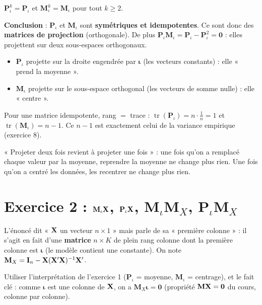 \documentclass[11pt,a4paper]{article}
\newcommand{\vi}{\bm{\iota}}
\newcommand{\I}{\mathbf{I}}\newcommand{\J}{\mathbf{J}}
\newcommand{\Pm}{\mathbf{P}}\newcommand{\Mm}{\mathbf{M}}
\newcommand{\tr}{\operatorname{tr}}\newcommand{\EQM}{\operatorname{EQM}}
\begin{document}
\begin{reponse}
$\Pm_\iota^k=\Pm_\iota$ et $\Mm_\iota^k=\Mm_\iota$ pour tout $k\ge2$.

\textbf{Conclusion} : $\Pm_\iota$ et $\Mm_\iota$ sont \textbf{symétriques et idempotentes}. Ce sont donc des \textbf{matrices de projection} (orthogonale). De plus $\Pm_\iota\Mm_\iota=\Pm_\iota-\Pm_\iota^2=\mathbf 0$ : elles projettent sur deux sous-espaces orthogonaux.
\begin{itemize}[nosep]
\item $\Pm_\iota$ projette sur la droite engendrée par $\vi$ (les vecteurs constants) : elle « prend la moyenne ».
\item $\Mm_\iota$ projette sur le sous-espace orthogonal (les vecteurs de somme nulle) : elle « centre ».
\end{itemize}
Pour une matrice idempotente, rang $=$ trace : $\tr(\Pm_\iota)=n\cdot\frac1n=1$ et $\tr(\Mm_\iota)=n-1$. Ce $n-1$ est exactement celui de la variance empirique (exercice 8).
\end{reponse}

\begin{intuition}
« Projeter deux fois revient à projeter une fois » : une fois qu'on a remplacé chaque valeur par la moyenne, reprendre la moyenne ne change plus rien. Une fois qu'on a centré les données, les recentrer ne change plus rien.
\end{intuition}

\section{Exercice 2 : $\Mm_\iota\vX$, $\Pm_\iota\vX$, $\Mm_\iota\Mm_X$, $\Pm_\iota\Mm_X$}

\begin{attention}
L'énoncé dit « $\mathbf{X}$ un vecteur $n\times1$ » mais parle de sa « première colonne » : il s'agit en fait d'une \textbf{matrice} $n\times K$ de plein rang colonne dont la première colonne est $\vi$ (le modèle contient une constante). On note $\Mm_X=\I_n-\vX(\vX'\vX)^{-1}\vX'$.
\end{attention}

\begin{idee}
Utiliser l'interprétation de l'exercice 1 ($\Pm_\iota$ = moyenne, $\Mm_\iota$ = centrage), et le fait clé : comme $\vi$ est une colonne de $\mathbf{X}$, on a $\Mm_X\vi=\mathbf 0$ (propriété $\Mm\vX=\mathbf 0$ du cours, colonne par colonne).
\end{idee}
\end{document}
